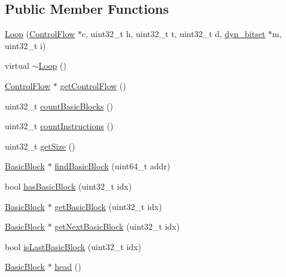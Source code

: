 \subsection*{\-Public \-Member \-Functions}
\begin{DoxyCompactItemize}
\item 
\hyperlink{class_e_p_a_x_1_1_loop_a2bae87ec3d967c7bd70300687723c327}{\-Loop} (\hyperlink{class_e_p_a_x_1_1_control_flow}{\-Control\-Flow} $\ast$c, uint32\-\_\-t h, uint32\-\_\-t t, uint32\-\_\-t d, \hyperlink{class_e_p_a_x_1_1dyn__bitset}{dyn\-\_\-bitset} $\ast$m, uint32\-\_\-t i)
\item 
virtual \hyperlink{class_e_p_a_x_1_1_loop_a4e3bd5964896020904db2cc76cae55fb}{$\sim$\-Loop} ()
\item 
\hyperlink{class_e_p_a_x_1_1_control_flow}{\-Control\-Flow} $\ast$ \hyperlink{class_e_p_a_x_1_1_loop_aaace2fef9ea1eb09918ecb56017da0a2}{get\-Control\-Flow} ()
\item 
uint32\-\_\-t \hyperlink{class_e_p_a_x_1_1_loop_a70b6e7c9894ab1984df350d155cd20e1}{count\-Basic\-Blocks} ()
\item 
uint32\-\_\-t \hyperlink{class_e_p_a_x_1_1_loop_a54ac86da0c06049b8af6c6128e96fdca}{count\-Instructions} ()
\item 
uint32\-\_\-t \hyperlink{class_e_p_a_x_1_1_loop_a4c4c2097f1cb528e553ae7e6d75b9b14}{get\-Size} ()
\item 
\hyperlink{class_e_p_a_x_1_1_basic_block}{\-Basic\-Block} $\ast$ \hyperlink{class_e_p_a_x_1_1_loop_ad6b1a8c5fc295c42de1996658150c5f5}{find\-Basic\-Block} (uint64\-\_\-t addr)
\item 
bool \hyperlink{class_e_p_a_x_1_1_loop_ab22ae5ef44f2e033fb5d4ced1d72734d}{has\-Basic\-Block} (uint32\-\_\-t idx)
\item 
\hyperlink{class_e_p_a_x_1_1_basic_block}{\-Basic\-Block} $\ast$ \hyperlink{class_e_p_a_x_1_1_loop_a4f64475b12d85dbee8cb207903eb0b3b}{get\-Basic\-Block} (uint32\-\_\-t idx)
\item 
\hyperlink{class_e_p_a_x_1_1_basic_block}{\-Basic\-Block} $\ast$ \hyperlink{class_e_p_a_x_1_1_loop_abad7041e4d159472e14fcd0900510581}{get\-Next\-Basic\-Block} (uint32\-\_\-t idx)
\item 
bool \hyperlink{class_e_p_a_x_1_1_loop_adef4258c1ff9bde98a568bb5a0398be8}{is\-Last\-Basic\-Block} (uint32\-\_\-t idx)
\item 
\hyperlink{class_e_p_a_x_1_1_basic_block}{\-Basic\-Block} $\ast$ \hyperlink{class_e_p_a_x_1_1_loop_ab5a3d377e2da69fe6822dbf66a7390cd}{head} ()
\item 

\end{DoxyCompactItemize}
